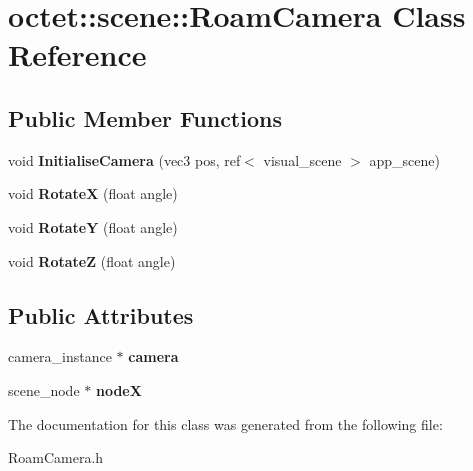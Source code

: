 \hypertarget{classoctet_1_1scene_1_1_roam_camera}{\section{octet\+:\+:scene\+:\+:Roam\+Camera Class Reference}
\label{classoctet_1_1scene_1_1_roam_camera}
}
\subsection*{Public Member Functions}
\begin{DoxyCompactItemize}
\item 
\hypertarget{classoctet_1_1scene_1_1_roam_camera_a0d1fd7e0811156e9e294eebb09a5428d}{void {\bfseries Initialise\+Camera} (vec3 pos, ref$<$ visual\+\_\+scene $>$ app\+\_\+scene)}\label{classoctet_1_1scene_1_1_roam_camera_a0d1fd7e0811156e9e294eebb09a5428d}

\item 
\hypertarget{classoctet_1_1scene_1_1_roam_camera_a30c24102b401c4418d58191145c7c209}{void {\bfseries Rotate\+X} (float angle)}\label{classoctet_1_1scene_1_1_roam_camera_a30c24102b401c4418d58191145c7c209}

\item 
\hypertarget{classoctet_1_1scene_1_1_roam_camera_ade90f82ea3a84e532c1b032ac11c4f66}{void {\bfseries Rotate\+Y} (float angle)}\label{classoctet_1_1scene_1_1_roam_camera_ade90f82ea3a84e532c1b032ac11c4f66}

\item 
\hypertarget{classoctet_1_1scene_1_1_roam_camera_a6d1354001c1fcb7bcd46bb7233e053ca}{void {\bfseries Rotate\+Z} (float angle)}\label{classoctet_1_1scene_1_1_roam_camera_a6d1354001c1fcb7bcd46bb7233e053ca}

\end{DoxyCompactItemize}
\subsection*{Public Attributes}
\begin{DoxyCompactItemize}
\item 
\hypertarget{classoctet_1_1scene_1_1_roam_camera_afdd8588764afc93d4739deb48dd7f33e}{camera\+\_\+instance $\ast$ {\bfseries camera}}\label{classoctet_1_1scene_1_1_roam_camera_afdd8588764afc93d4739deb48dd7f33e}

\item 
\hypertarget{classoctet_1_1scene_1_1_roam_camera_a9f85ad40528b196cfa5e56222f36a8be}{scene\+\_\+node $\ast$ {\bfseries node\+X}}\label{classoctet_1_1scene_1_1_roam_camera_a9f85ad40528b196cfa5e56222f36a8be}

\end{DoxyCompactItemize}


The documentation for this class was generated from the following file\+:\begin{DoxyCompactItemize}
\item 
Roam\+Camera.\+h\end{DoxyCompactItemize}
